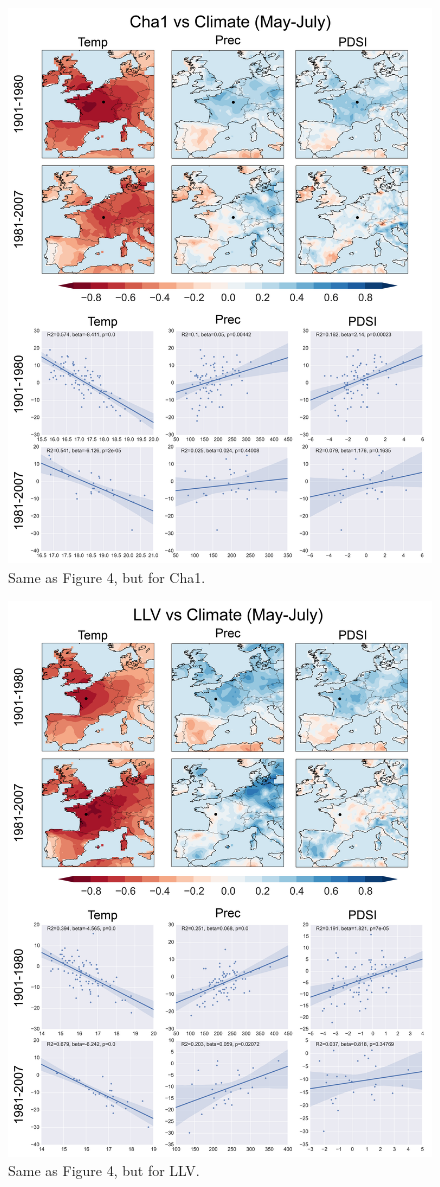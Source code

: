 \documentclass[12pt]{article}
\begin{document}
\begin{figure}
\center
\includegraphics[width=.9\columnwidth,scale=2]{SUPP_fig_07_Cha1_MJJ_climate.png}
\caption{Same as Figure 4, but for Cha1.}
\end{figure}

\begin{figure}
\center
\includegraphics[width=.9\columnwidth,scale=2]{SUPP_fig_08_LLV_MJJ_climate.png}
\caption{Same as Figure 4, but for LLV.}
\end{figure}
\end{document}
